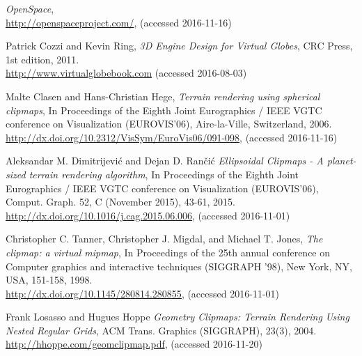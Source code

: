 \cleardoublepage
{}
{}
\begin{thebibliography}{99}



  \emph{OpenSpace},
  \\
  \url{http://openspaceproject.com/},
  (accessed 2016-11-16)

  Patrick Cozzi and Kevin Ring,
  \emph{3D Engine Design for Virtual Globes},
  CRC Press,
  1st edition,
  2011. \\
  \url{http://www.virtualglobebook.com}
  (accessed 2016-08-03)

  Malte Clasen and Hans-Christian Hege,
  \emph{Terrain rendering using spherical clipmaps},
  In Proceedings of the Eighth Joint Eurographics / IEEE VGTC conference on Visualization (EUROVIS'06),
  Aire-la-Ville, Switzerland,
  2006. \\
  \url{http://dx.doi.org/10.2312/VisSym/EuroVis06/091-098},
  (accessed 2016-11-16)

  Aleksandar M. Dimitrijevi\'{c} and Dejan D. Ran\v{c}i\'{c}
  \emph{Ellipsoidal Clipmaps - A planet-sized terrain rendering algorithm},
  In Proceedings of the Eighth Joint Eurographics / IEEE VGTC conference on Visualization (EUROVIS'06),
  Comput. Graph. 52, C (November 2015), 43-61,
  2015. \\
  \url{http://dx.doi.org/10.1016/j.cag.2015.06.006},
  (accessed 2016-11-01)

  Christopher C. Tanner, Christopher J. Migdal, and Michael T. Jones,
  \emph{The clipmap: a virtual mipmap},
  In Proceedings of the 25th annual conference on Computer graphics and interactive techniques (SIGGRAPH '98),
  New York, NY, USA, 151-158,
  1998. \\
  \url{http://dx.doi.org/10.1145/280814.280855},
  (accessed 2016-11-01)

  Frank Losasso and Hugues Hoppe
  \emph{Geometry Clipmaps: Terrain Rendering Using Nested Regular Grids},
  ACM Trans. Graphics (SIGGRAPH), 23(3),
  2004. \\
  \url{http://hhoppe.com/geomclipmap.pdf},
  (accessed 2016-11-20)
  

\end{thebibliography}
